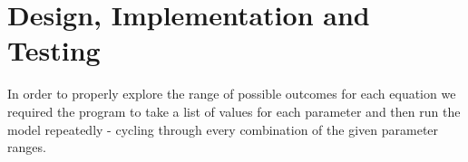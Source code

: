 

\chapter{Design, Implementation and Testing}

In order to properly explore the range of possible outcomes for each equation we required the program to take a list of values for each parameter and then run the model repeatedly - cycling through every combination of the given parameter ranges. 